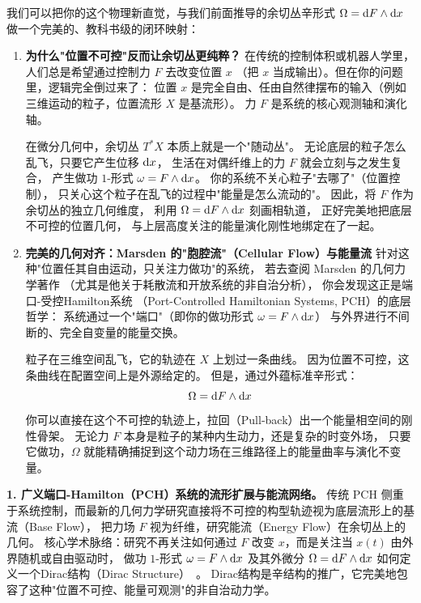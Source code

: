 ﻿\documentclass[10pt,a4paper]{article}
\begin{document}
\begin{framed}
我们可以把你的这个物理新直觉，与我们前面推导的余切丛辛形式
$\Omega = \text dF \wedge \text dx$ 做一个完美的、教科书级的闭环映射：

\begin{enumerate}
  \item \textbf{为什么"位置不可控"反而让余切丛更纯粹？}
  在传统的控制体积或机器人学里，人们总是希望通过控制力 $F$ 去改变位置 $x$
  （把 $x$ 当成输出）。但在你的问题里，逻辑完全倒过来了：
  位置 $x$ 是完全自由、任由自然律摆布的输入（例如三维运动的粒子，位置流形 $X$ 是基流形）。
  力 $F$ 是系统的核心观测轴和演化轴。

  在微分几何中，余切丛 $T^*X$ 本质上就是一个"随动丛"。
  无论底层的粒子怎么乱飞，只要它产生位移 $\text dx$，
  生活在对偶纤维上的力 $F$ 就会立刻与之发生复合，
  产生做功 $1$-形式 $\omega = F \wedge \text dx$。
  你的系统不关心粒子"去哪了"（位置控制），
  只关心这个粒子在乱飞的过程中"能量是怎么流动的"。
  因此，将 $F$ 作为余切丛的独立几何维度，
  利用 $\Omega = \text dF \wedge \text dx$ 刻画相轨道，
  正好完美地把底层不可控的位置几何，
  与上层高度关注的能量演化刚性地绑定在了一起。

  \item \textbf{完美的几何对齐：Marsden 的"胞腔流"（Cellular Flow）与能量流}
  针对这种"位置任其自由运动，只关注力做功"的系统，
  若去查阅 Marsden 的几何力学著作
  （尤其是他关于耗散流和开放系统的非自治分析），
  你会发现这正是端口-受控Hamilton系统
  （Port-Controlled Hamiltonian Systems, PCH）的底层哲学：
  系统通过一个"端口"（即你的做功形式 $\omega = F \wedge \text dx$）
  与外界进行不间断的、完全自变量的能量交换。

  粒子在三维空间乱飞，它的轨迹在 $X$ 上划过一条曲线。
  因为位置不可控，这条曲线在配置空间上是外源给定的。
  但是，通过外蕴标准辛形式：
  \begin{equation}
    \Omega = \text dF \wedge \text dx
  \end{equation}
  你可以直接在这个不可控的轨迹上，拉回（Pull-back）出一个能量相空间的刚性骨架。
  无论力 $F$ 本身是粒子的某种内生动力，还是复杂的时变外场，
  只要它做功，$\Omega$ 就能精确捕捉到这个动力场在三维路径上的能量曲率与演化不变量。
\end{enumerate}



\textbf{1. 广义端口-Hamilton（PCH）系统的流形扩展与能流网络。}
传统 PCH 侧重于系统控制，而最新的几何力学研究直接将不可控的构型轨迹视为底层流形上的基流（Base Flow），
把力场 $F$ 视为纤维，研究能流（Energy Flow）在余切丛上的几何。
核心学术脉络：研究不再关注如何通过 $F$ 改变 $x$，而是关注当 $x(t)$ 由外界随机或自由驱动时，
做功 $1$-形式 $\omega = F \wedge \text dx$ 及其外微分 $\Omega = \text dF \wedge \text dx$ 如何定义一个Dirac结构（Dirac Structure）~\cite{Courant1990}。
Dirac结构是辛结构的推广，它完美地包容了这种"位置不可控、能量可观测"的非自治动力学。


\end{framed}
\end{document}
